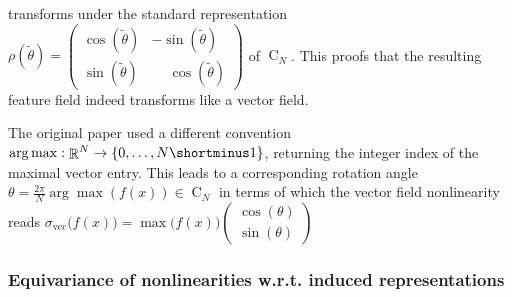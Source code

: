 \documentclass{article}
\DeclareMathOperator*{\R}{\mathbb{R}}
\newcommand{\CN}{\ensuremath{\operatorname{C}_{\!N}}}
\begin{document}
transforms under the standard representation
$\rho(\tilde{\theta})=
            \begin{pmatrix}
                \cos(\tilde{\theta}) &          - \sin(\tilde{\theta}) \\
                \sin(\tilde{\theta}) & \phantom{-}\cos(\tilde{\theta})
            \end{pmatrix}
$
of $\CN$.
This proofs that the resulting feature field indeed transforms like a vector field.

The original paper \cite{Marcos2017-VFN} used a different convention $\arg\max:\R^N\to\{0,\dots,N\shortminus1\}$, returning the integer index of the maximal vector entry.
This leads to a corresponding rotation angle $\theta=\frac{2\pi}{N}\arg\max(f(x))\in\CN$ in terms of which the vector field nonlinearity reads
$\sigma_\text{vec}\big(f(x)\big) = \max\big(f(x)\big) \begin{pmatrix} \cos(\theta) \\ \sin(\theta) \end{pmatrix}$








\subsubsection{Equivariance of nonlinearities w.r.t. induced representations}
\label{apx:equivariance_nonlin_induced}
\end{document}
